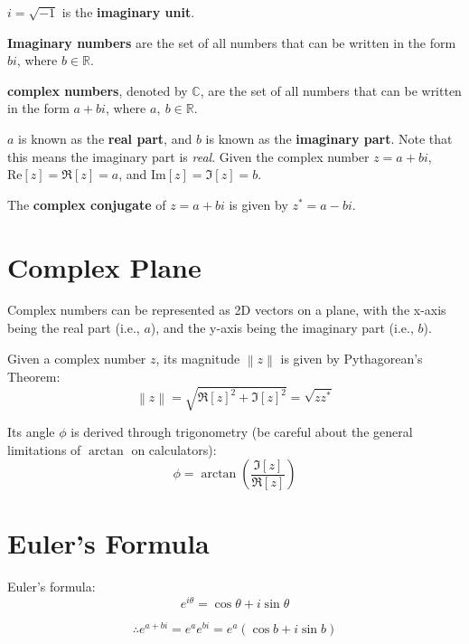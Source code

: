 \documentclass[a4paper, titlepage]{book}
\begin{document}
\(i = \sqrt{-1}\) is the \textbf{imaginary unit}.

\textbf{Imaginary numbers} are the set of all numbers that can be written in the form \(bi\),
where \(b \in \mathbb{R}\).

\textbf{complex numbers}, denoted by \(\mathbb{C}\),
are the set of all numbers that can be written in the form \(a + bi\),
where \(a,~b \in \mathbb{R}\).

\(a\) is known as the \textbf{real part},
and \(b\) is known as the \textbf{imaginary part}.
Note that this means the imaginary part is \emph{real}.
Given the complex number \(z = a + bi\),
\(\mathrm{Re}[z] = \Re[z] = a\), and \(\mathrm{Im}[z] = \Im[z] = b\).

The \textbf{complex conjugate} of \(z = a + bi\) is given by \(z^* = a - bi\).

\section{Complex Plane}

Complex numbers can be represented as 2D vectors on a plane,
with the x-axis being the real part (i.e., \(a\)),
and the y-axis being the imaginary part (i.e., \(b\)).

Given a complex number \(z\),
its magnitude \(\left\|z\right\|\) is given by Pythagorean's Theorem:
\begin{equation}
    \left\|z\right\| = \sqrt{\Re[z]^2 + \Im[z]^2} = \sqrt{z z^*}
\end{equation}

Its angle \(\phi\) is derived through trigonometry
(be careful about the general limitations of \(\arctan\) on calculators):
\begin{equation}
    \phi = \arctan\left(\frac{\Im[z]}{\Re[z]}\right)
\end{equation}

\section{Euler's Formula}

Euler's formula:
\begin{equation}
    e^{i \theta} = \cos\theta + i \sin\theta
\end{equation}

\begin{equation}
    \therefore e^{a + bi} = e^a e^{bi} = e^a \left(\cos b + i \sin b\right)
\end{equation}
\end{document}
